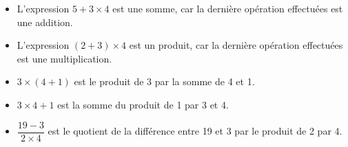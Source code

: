\documentclass[12pt,a4paper]{article}
\begin{document}
	
\begin{myexs}
	\begin{itemize}
		\item L'expression $5 + 3 \times 4$ est une somme, car la dernière opération effectuées est une addition.
		
		\item L'expression $(2 + 3 ) \times 4$ est un produit, car la dernière opération effectuées est une multiplication.
		
		\item $ 3 \times (4 + 1)$ est le produit de 3 par la somme de 4 et 1.
		
		\item $ 3 \times 4 + 1$ est la somme du produit de 1 par 3 et  4.
		
		\item $\dfrac{19 - 3}{2 \times 4}$ est le quotient de la différence entre  19 et 3 par le produit de 2 par 4.
	\end{itemize}
\end{myexs}

\end{document}
